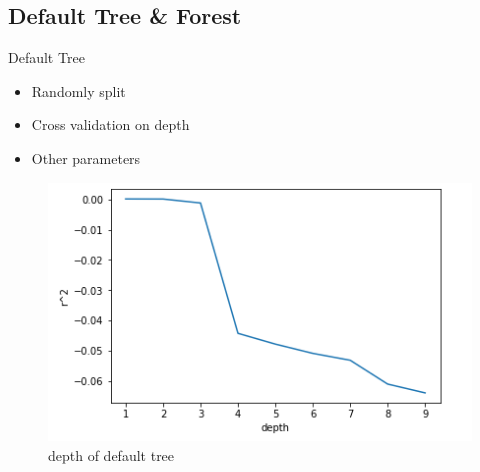\documentclass{beamer}
\begin{document}
\subsection{Default Tree \& Forest}
\begin{frame}{Default Tree}
\begin{itemize}
    \item Randomly split
    \item Cross validation on depth
    \item Other parameters
\end{itemize}

\begin{figure}[ht]
        \centering
        \includegraphics[width=0.7\linewidth,height=0.4\linewidth]{depth_default_tree.png}
        \caption{depth of default tree}
        \label{fig:label}
    \end{figure}
\end{frame}
\end{document}
